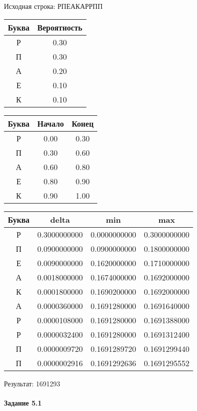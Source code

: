\documentclass[a4paper, 12pt]{article}
\begin{document}
Исходная строка: РПЕАКАРРПП\
\begin{center}
 \begin{tabular}{ |c|c| } 
  \hline
     Буква & Вероятность \\ \hline
Р & 0.30\\\hline
П & 0.30\\\hline
А & 0.20\\\hline
Е & 0.10\\\hline
К & 0.10
\\ \hline \end{tabular}
\end{center}
\begin{center}
 \begin{tabular}{ |c|c|c| } 
  \hline
     Буква & Начало & Конец \\ \hline
Р & 0.00 & 0.30\\\hline
П & 0.30 & 0.60\\\hline
А & 0.60 & 0.80\\\hline
Е & 0.80 & 0.90\\\hline
К & 0.90 & 1.00
\\ \hline \end{tabular}
\end{center}
\begin{center}
 \begin{tabular}{ |c|c|c|c| } 
  \hline
     Буква & delta & min & max \\ \hline
Р & 0.3000000000 & 0.0000000000 & 0.3000000000\\\hline
П & 0.0900000000 & 0.0900000000 & 0.1800000000\\\hline
Е & 0.0090000000 & 0.1620000000 & 0.1710000000\\\hline
А & 0.0018000000 & 0.1674000000 & 0.1692000000\\\hline
К & 0.0001800000 & 0.1690200000 & 0.1692000000\\\hline
А & 0.0000360000 & 0.1691280000 & 0.1691640000\\\hline
Р & 0.0000108000 & 0.1691280000 & 0.1691388000\\\hline
Р & 0.0000032400 & 0.1691280000 & 0.1691312400\\\hline
П & 0.0000009720 & 0.1691289720 & 0.1691299440\\\hline
П & 0.0000002916 & 0.1691292636 & 0.1691295552
\\ \hline \end{tabular}
\end{center}
Результат: 1691293
\pagebreak
\paragraph{Задание 5.1}
\end{document}
